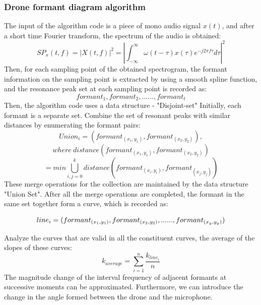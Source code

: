 \documentclass{sig-alternate-10pt}
\begin{document}
\subsubsection{Drone formant diagram algorithm}
The input of the algorithm code is a piece of mono audio signal $x(t)$, and after a short time Fourier transform, the spectrum of the audio is obtained:
$$SP_x(t,f)=|X(t,f)|^2=|\int_{-\infty}^\infty\omega(t-\tau)x(\tau)e^{-j2\pi f\tau}d\tau|^2$$
Then, for each sampling point of the obtained spectrogram, the formant information on the sampling point is extracted by using a smooth spline function, and the resonance peak set at each sampling point is recorded as:
$$formant_1,formant_2,......,formant_t$$
Then, the algorithm code uses a data structure - "Disjoint-set" Initially, each formant is a separate set. Combine the set of resonant peaks with similar distances by enumerating the formant pairs:
$$Union_i=(formant_{(x_1,y_1)},formant_{(x_2,y_2)}),$$
$$where\ distance(formant_{(x_1,y_1)},formant_{(x_2,y_2)})$$
$$=min\bigcup_{i,j=0}^k distance(formant_{(x_i,y_i)},formant_{(x_j,y_j)})$$
These merge operations for the collection are maintained by the data structure "Union Set". After all the merge operations are completed, the formant in the same set together form a curve, which is recorded as:

$$line_i=(formant_{(x_1,y_1)},formant_{(x_2,y_2)},......\\,formant_{(x_y,y_y)})$$



Analyze the curves that are valid in all the constituent curves, the average of the slopes of these curves:
$$k_{average}=\sum_{i=1}^n\frac{k_{{line}_i}}{n}$$
The magnitude change of the interval frequency of adjacent formants at successive moments can be approximated. Furthermore, we can introduce the change in the angle formed between the drone and the microphone.
\end{document}
